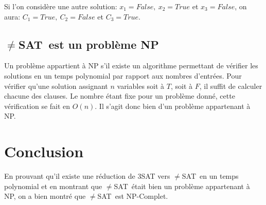 \documentclass[a4paper,11pt]{article}
\newcommand{\neqsat}{$\neq$SAT}
\begin{document}
      Si l'on considère une autre solution: $x_1 = False,\ x_2 = True$ et $x_3 = False$, on aura: $C_1 = True,\ C_2 = False$ et $C_3 = True$.
      
  \subsection{\neqsat\ est un problème NP}
    Un problème appartient à NP s'il existe un algorithme permettant de vérifier les solutions en un temps polynomial par rapport aux nombres d'entrées.  Pour vérifier qu'une solution assignant $n$ variables soit à $T$, soit à $F$, il suffit de calculer chacune des clauses.  Le nombre étant fixe pour un problème donné, cette vérification se fait en $O(n)$.  Il s'agit donc bien d'un problème appartenant à NP.
  
\section{Conclusion}
  En prouvant qu'il existe une réduction de 3SAT vers \neqsat\ en un temps polynomial et en montrant que \neqsat\ était bien un problème appartenant à NP, on a bien montré que \neqsat\ est NP-Complet.
  
  
  
\end{document}
